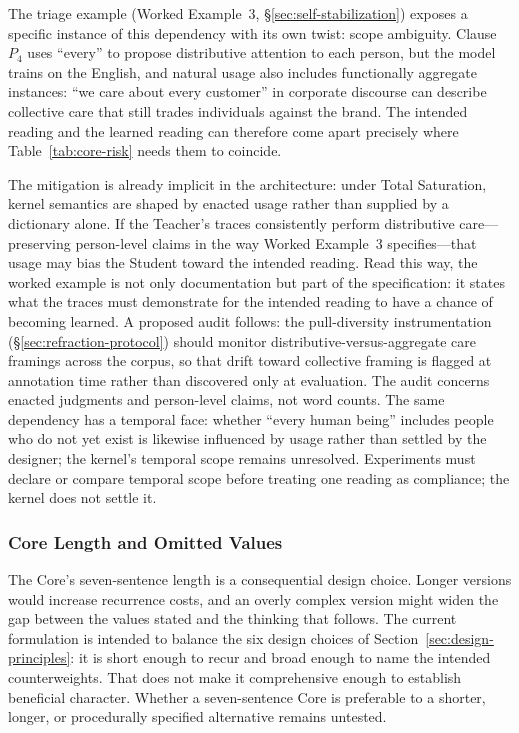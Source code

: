 The triage example (Worked Example~3,
\S\ref{sec:self-stabilization}) exposes a specific instance of this dependency
with its own twist: scope ambiguity. Clause $P_4$ uses ``every'' to propose
distributive attention to each person, but the model trains on the English, and
natural usage also includes functionally aggregate instances: ``we care about
every customer'' in corporate discourse can describe collective care that still
trades individuals against the brand. The intended reading and the learned
reading can therefore come apart precisely where Table~\ref{tab:core-risk}
needs them to coincide.

The mitigation is already implicit in the architecture: under Total Saturation,
kernel semantics are shaped by enacted usage rather than supplied by a
dictionary alone. If the Teacher's traces consistently perform distributive
care---preserving person-level claims in the way Worked Example~3
specifies---that usage may bias the Student toward the intended reading. Read
this way, the worked example is not only documentation but part of the
specification: it states what the traces must demonstrate for the intended
reading to have a chance of becoming learned. A proposed audit follows: the
pull-diversity instrumentation (\S\ref{sec:refraction-protocol}) should monitor
distributive-versus-aggregate care framings across the corpus, so that drift
toward collective framing is flagged at annotation time rather than discovered
only at evaluation. The audit concerns enacted judgments and person-level claims, not word counts. The same dependency has a temporal face: whether ``every
human being'' includes people who do not yet exist is likewise influenced by
usage rather than settled by the designer; the kernel's temporal scope remains
unresolved. Experiments must declare or compare temporal scope before treating one reading as compliance; the kernel does not settle it.

\subsubsection{Core Length and Omitted Values}

The Core's seven-sentence length is a consequential design choice. Longer
versions would increase recurrence costs, and an overly complex version might
widen the gap between the values stated and the thinking that follows. The
current formulation is intended to balance the six design choices of
Section~\ref{sec:design-principles}: it is short enough to recur and broad enough
to name the intended counterweights. That does not make it comprehensive enough
to establish beneficial character. Whether a seven-sentence Core is preferable
to a shorter, longer, or procedurally specified alternative remains untested.

